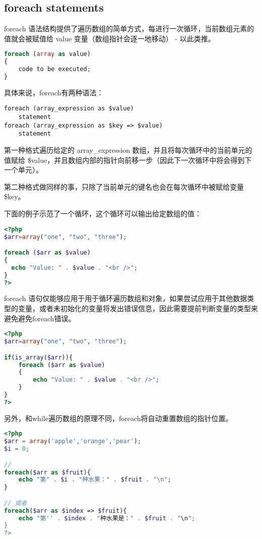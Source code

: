 \subsection{foreach statements}



foreach 语法结构提供了遍历数组的简单方式，每进行一次循环，当前数组元素的值就会被赋值给 value 变量（数组指针会逐一地移动） - 以此类推。


\begin{lstlisting}[language=PHP]
foreach (array as value)
{
    code to be executed;
}
\end{lstlisting}

具体来说，foreach有两种语法：

\begin{verbatim}
foreach (array_expression as $value)
    statement
foreach (array_expression as $key => $value)
    statement
\end{verbatim}

第一种格式遍历给定的 array\_expression 数组，并且将每次循环中的当前单元的值赋给 \$value，并且数组内部的指针向前移一步（因此下一次循环中将会得到下一个单元）。

第二种格式做同样的事，只除了当前单元的键名也会在每次循环中被赋给变量 \$key。



下面的例子示范了一个循环，这个循环可以输出给定数组的值：

\begin{lstlisting}[language=PHP]
<?php
$arr=array("one", "two", "three");

foreach ($arr as $value)
{
  echo "Value: " . $value . "<br />";
}
?>
\end{lstlisting}

foreach 语句仅能够应用于用于循环遍历数组和对象，如果尝试应用于其他数据类型的变量，或者未初始化的变量将发出错误信息，因此需要提前判断变量的类型来避免避免foreach错误。

\begin{lstlisting}[language=PHP]
<?php
$arr=array("one", "two", "three");

if(is_array($arr)){
	foreach ($arr as $value)
	{
		echo "Value: " . $value . "<br />";
	}
}
?>
\end{lstlisting}


另外，和while遍历数组的原理不同，foreach将自动重置数组的指针位置。

\begin{lstlisting}[language=PHP]
<?php
$arr = array('apple','orange','pear');
$i = 0;

// 
foreach($arr as $fruit){
	echo "第" . $i . "种水果：" . $fruit . "\n";
}

// 或者
foreach($arr as $index => $fruit){
	echo "第'' . $index . "种水果是：" . $fruit . "\n";
}
?>
\end{lstlisting}


